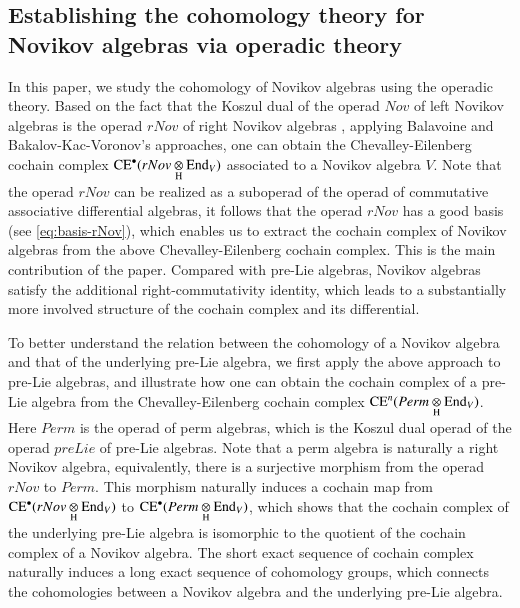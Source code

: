 \documentclass[12pt]{amsart}
\theoremstyle{definition}
\newcommand{\End}{\mathrm{End}}
\newcommand{\ot}{\otimes}
\newcommand{\ce}{{\rm CE}}
\begin{document}
 \vspace{-3mm}

\subsection{Establishing the cohomology theory for Novikov algebras via operadic theory}
In this paper, we study the cohomology of Novikov algebras using the operadic theory.
Based on the fact that the Koszul dual of the operad $Nov$ of left Novikov algebras is the operad $rNov$ of right Novikov algebras \cite{D}, applying Balavoine and Bakalov-Kac-Voronov's approaches, one can obtain the Chevalley-Eilenberg cochain complex $\ce^\bullet(rNov\underset{\rm H}{\ot}\End_V)$ associated to a Novikov algebra $V$. Note that the operad $rNov$ can be realized as a suboperad of the operad of commutative associative differential algebras, it follows that the operad $rNov$ has a good basis (see \eqref{eq:basis-rNov}), which enables us to extract the cochain complex of Novikov algebras from the above Chevalley-Eilenberg cochain complex. This is the main contribution of the paper. Compared with pre-Lie algebras, Novikov algebras satisfy the additional right-commutativity identity, which leads to a substantially more involved structure of the cochain complex and its differential.

To better understand the relation between the cohomology of a Novikov algebra and  that of  the underlying pre-Lie algebra, we first apply the above approach to pre-Lie algebras, and illustrate how one can obtain the cochain complex of a pre-Lie algebra from the Chevalley-Eilenberg cochain complex $\ce^n(Perm\underset{\rm H}{\ot}\End_V)$. Here $Perm$ is the operad of perm algebras, which is the  Koszul dual operad of the operad $preLie$ of pre-Lie algebras. Note that a perm algebra is naturally a right Novikov algebra, equivalently, there is a surjective morphism from the operad $rNov$ to $Perm$. This morphism naturally induces a cochain map from $\ce^\bullet(rNov\underset{\rm H}{\ot}\End_V)$ to $\ce^\bullet(Perm\underset{\rm H}{\ot}\End_V)$, which shows that the cochain complex of the underlying pre-Lie algebra is isomorphic to the  quotient  of the cochain complex of a Novikov algebra. The short exact sequence of cochain complex naturally induces a long exact sequence of cohomology groups, which connects the cohomologies between a Novikov algebra and the underlying pre-Lie algebra.
\end{document}
